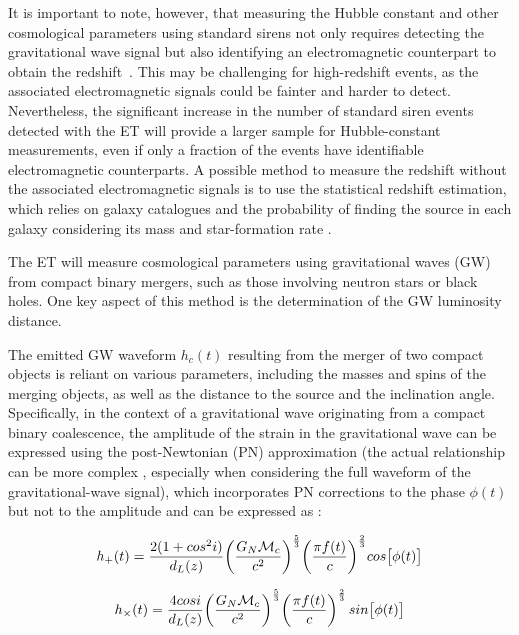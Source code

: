 \documentclass[universe,article,accept,moreauthors,pdftex]{Definitions/mdpi}
\begin{document}
It is important to note, however, that measuring the Hubble constant and other cosmological parameters using standard sirens not only requires detecting the gravitational wave signal but also identifying an electromagnetic counterpart to obtain the \mbox{redshift \cite{Zhang:2019ylr,Califano:2022syd}}. This may be challenging for high-redshift events, as the associated electromagnetic signals could be fainter and harder to detect. Nevertheless, the significant increase in the number of standard siren events detected with the ET will provide a larger sample for Hubble-constant measurements, even if only a fraction of the events have identifiable electromagnetic counterparts.   A possible method to measure the redshift without the associated electromagnetic signals is to use the statistical redshift estimation, which relies on galaxy catalogues and the probability of finding the source in each galaxy considering its mass and star-formation rate \cite{schutz1986,abbott2017,chen2021}.

The ET will measure cosmological parameters using gravitational waves (GW) from compact binary mergers, such as those involving neutron stars or black holes. One key aspect of this method is the determination of the GW luminosity distance. 

The emitted GW waveform $h_{c}(t)$ resulting from the merger of two compact objects is reliant on various parameters, including the masses and spins of the merging objects, as well as the distance to the source and the inclination angle.  Specifically, in the context of a gravitational wave originating from a compact binary coalescence, the amplitude of the strain in the gravitational wave can be expressed using the post-Newtonian (PN) approximation (the actual relationship can be more complex \cite{Khan:2015jqa,Breschi:2022xnc,Breschi:2022ens,timedomain,Estelles:2021gvs}, especially when considering the full waveform of the gravitational-wave signal), which incorporates PN corrections to the phase $\phi(t)$ but not to the amplitude and can be expressed as \cite{10.1093/acprof:oso/9780198570745.001.0001,10.1093/oso/9780198570899.001.0001, Belgacem_2019}:

\begin{equation}
h_{+}(t)=  \frac{2(1+cos^{2}i)}{d_{L}(z)}  \bigg{(}\frac{G_{N}\mathcal{M}_{c}}{c^{2}}\bigg{)}^{\frac{5}{3}}\bigg{(}\frac{\pi f(t)}{c}\bigg{)}^{\frac{2}{3}}cos\big{[}\phi(t)\big{]}
\end{equation}

\begin{equation}
h_{\times}(t)=  \frac{4cosi}{d_{L}(z)}  \bigg{(}\frac{G_{N}\mathcal{M}_{c}}{c^{2}}\bigg{)}^{\frac{5}{3}}\bigg{(}\frac{\pi f(t)}{c}\bigg{)}^{\frac{2}{3}}\,sin\big{[}\phi(t)\big{]}
\end{equation}
\end{document}
